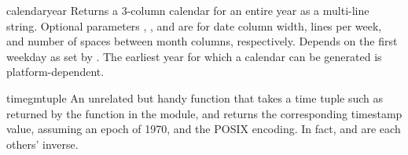 \begin{funcdesc}{calendar}{year}
Returns a 3-column calendar for an entire year as a multi-line string.
Optional parameters , , and  are for date column
width, lines per week, and number of spaces between month columns,
respectively. Depends on the first weekday as set by
.  The earliest year for which a calendar can
be generated is platform-dependent.
\end{funcdesc}

\begin{funcdesc}{timegm}{tuple}
An unrelated but handy function that takes a time tuple such as
returned by the  function in the 
module, and returns the corresponding \UNIX{} timestamp value, assuming
an epoch of 1970, and the POSIX encoding.  In fact,
 and  are each others' inverse.
\end{funcdesc}


\begin{seealso}
\end{seealso}
